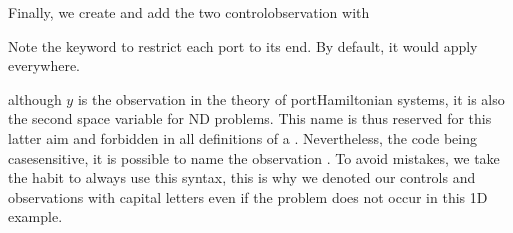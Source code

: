 \documentclass[letterpaper,10pt,english]{sphinxmanual}
\begin{document}
\sphinxAtStartPar
Finally, we create and add the two control\sphinxhyphen{}observation  with

\begin{sphinxVerbatim}[commandchars=\\\{\}]
          
         
          
         
\end{sphinxVerbatim}

\sphinxAtStartPar
Note the  keyword  to restrict each port to its end.
By default, it would apply everywhere.

\sphinxAtStartPar
{} although \(y\) is the observation in the theory
of port\sphinxhyphen{}Hamiltonian systems, it is also the second space variable for
N\sphinxhyphen{}D problems. This name is thus reserved for this latter aim and
forbidden in all definitions of a . Nevertheless, the code being
case\sphinxhyphen{}sensitive, it is possible to name the observation . To avoid
mistakes, we take the habit to always use this syntax, this is why we
denoted our controls and observations with capital letters even if the
problem does not occur in this 1D example.
\end{document}
